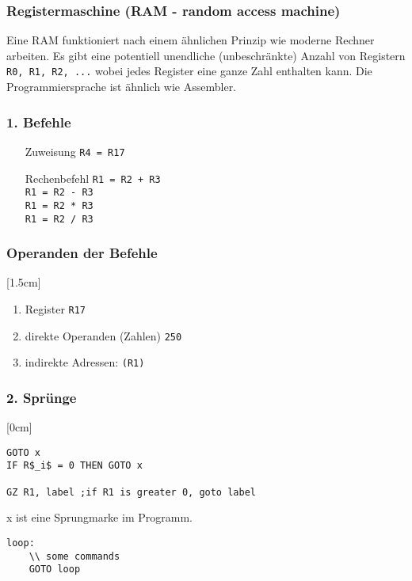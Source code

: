 \subsubsection{Registermaschine (RAM - random access machine)}
Eine RAM funktioniert nach einem ähnlichen Prinzip wie moderne Rechner arbeiten. Es gibt eine potentiell unendliche (unbeschränkte) Anzahl von Registern \lstinline!R0, R1, R2, ...! wobei jedes Register eine ganze Zahl enthalten kann. Die Programmiersprache ist ähnlich wie Assembler.\\
\subsubsection*{1. Befehle}
\begin{enumerate}
\item[Zuweisung] \lstinline!R4 = R17!
\item[Rechenbefehl] \lstinline!R1 = R2 + R3!\\\lstinline!R1 = R2 - R3!\\\lstinline!R1 = R2 * R3!\\\lstinline!R1 = R2 / R3!
\end{enumerate}
\subsubsection*{Operanden der Befehle}
[1.5cm]
\begin{enumerate}
\item Register \lstinline!R17!
\item direkte Operanden (Zahlen) \lstinline!250!
\item indirekte Adressen: \lstinline!(R1)!
\end{enumerate}
\subsubsection*{2. Sprünge}
[0cm]
\begin{lstlisting}[mathescape]
GOTO x
IF R$_i$ = 0 THEN GOTO x

GZ R1, label ;if R1 is greater 0, goto label

\end{lstlisting}
x ist eine Sprungmarke im Programm.
\begin{lstlisting}
loop:
	\\ some commands
	GOTO loop
\end{lstlisting}

